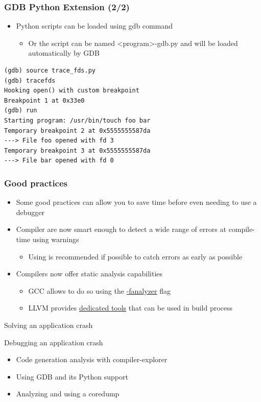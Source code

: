 \begin{frame}[fragile]
  \frametitle{GDB Python Extension (2/2)}
  \begin{itemize}
    \item Python scripts can be loaded using gdb  command
    \begin{itemize}
      \item Or the script can be named <program>-gdb.py and will be loaded automatically by GDB
    \end{itemize}
  \end{itemize}
  \begin{block}{}
    \begin{verbatim}
(gdb) source trace_fds.py 
(gdb) tracefds 
Hooking open() with custom breakpoint
Breakpoint 1 at 0x33e0
(gdb) run
Starting program: /usr/bin/touch foo bar
Temporary breakpoint 2 at 0x5555555587da
---> File foo opened with fd 3
Temporary breakpoint 3 at 0x5555555587da
---> File bar opened with fd 0
    \end{verbatim}
  \end{block}
\end{frame}

\begin{frame}
  \frametitle{Good practices}
  \begin{itemize}
    \item Some good practices can allow you to save time before even needing to
          use a debugger
    \item Compiler are now smart enough to detect a wide range of errors at
          compile-time using warnings
    \begin{itemize}
      \item Using  is recommended if possible to catch
            errors as early as possible
    \end{itemize}
    \item Compilers now offer static analysis capabilities
    \begin{itemize}
      \item GCC allows to do so using the \href{https://gcc.gnu.org/onlinedocs/gcc-11.1.0/gcc/Static-Analyzer-Options.html}{-fanalyzer} flag
      \item LLVM provides \href{https://clang-analyzer.llvm.org/command-line.html}{dedicated tools} that can be used in build process
    \end{itemize}
  \end{itemize}
\end{frame}

\setuplabframe
{Solving an application crash}
{
  Debugging an application crash
  \begin{itemize}
    \item Code generation analysis with compiler-explorer
    \item Using GDB and its Python support
    \item Analyzing and using a coredump
  \end{itemize}
}
